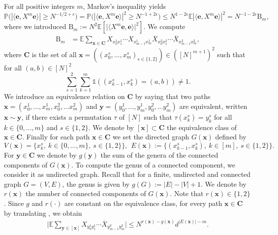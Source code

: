 \documentclass[11pt]{article}
\newcommand{\absbb}[1]{\biggl| #1 \biggr|}
\newcommand{\patx}{\boldsymbol{x}}
\newcommand{\paty}{\boldsymbol{y}}
\theoremstyle{plain}
\theoremstyle{remark}
\numberwithin{equation}{section}
\begin{document}
For all positive integers $m$, Markov's inequality yields 
\begin{equation}\label{eq:bound_pb_Am2}
  \mathbb{P} \bigl( |\langle \mathbf e, X^m \mathbf e \rangle| \ge N^{-1/2+ \epsilon} \bigr) =  \mathbb{P} \bigl( |\langle \mathbf e, X^m \mathbf e \rangle|^2 \ge N^{-1 + 2 \epsilon}\bigr) \le N^{1- 2\epsilon}{\mathbb{E} |\langle \mathbf e, X^m \mathbf e \rangle|^2}
  = N^{-1 -2 \epsilon} \mathrm{B}_m, 
\end{equation}
where we introduced $\mathrm{B}_{m}:= N^2\mathbb{E}[\big|\langle X^m \mathbf e, \mathbf e \rangle \big|^2]$. We compute 
    \begin{align*}
\mathrm{B}_{m} &= \mathbb{E} \sum_{\patx\in \boldsymbol C} X_{x_0^1 x_1^1} \cdots X_{x_{m-1}^{1} x_{m}^{1}} \overline{X}_{x_{0}^{2} x_{1}^{2}} \cdots\overline{X}_{x_{m-1}^2 x_m^2}, 
    \end{align*}
where $\boldsymbol{C}$ is the set of all $\patx = ((x^s_0,...,x^s_m)_{s\in \{1,2\}}) \in ([N]^{m+1})^2$ such that for all $(a,b) \in [N]^2$
    $$\sum_{s=1}^2\sum_{k=1}^m \mathds{1}\left( (x^s_{k-1} , x^s_{k}) = (a,b) \right) \neq 1.$$
   We introduce an equivalence relation on $\boldsymbol C$ by saying that two paths $\patx=(x_0^1,\ldots, x_m^1,x_0^2, \ldots x_m^2)$ and $\boldsymbol y=(y_0^1,\ldots, y_m^1,y_0^2, \ldots y_m^2)$ are equivalent, written $\patx \sim \boldsymbol y$,  if there exists a permutation $\tau$ of $[N]$ such that $\tau(x_k^s) = {y}^s_k$ for all $k \in \{0,...,m\}$ and $s \in \{1,2\}$. We denote by $[\patx] \subset \boldsymbol C$ the equivalence class of $\patx \in \boldsymbol C$. Finally for each path $\patx \in \boldsymbol C$ we set the directed graph $G(\patx)$ defined by
\begin{equation*}
    V(\patx) = \{x_k^s,~k\in \{0,...,m \}, ~ s \in  \{1,2\}\}, ~~ E(\patx):= \{ (x_{k-1}^s, x_k^s),~k \in [m],~ s \in  \{1,2\}\}.
\end{equation*}
 For $\paty \in \boldsymbol C$ we denote by $g(\paty)$ the  sum of the genera of the connected components of $G(\patx)$. To compute the genus of a connected component, we consider it as undirected graph. Recall that for a finite, undirected and connected graph $G=(V,E)$, the genus is given by $g(G):= |E|-|V|+1$. 
We denote by $r(\patx)$ the number of connected components of $G(\patx)$. Note that $ r(\patx) \in \{1 , 2\}$. Since $g$ and $r(\cdot)$ are constant on the equivalence class, for every  path $\patx \in \boldsymbol C$ by translating \cite[proof of Lemma~5.3]{BBK_spec_radii}, we obtain
\begin{align}\label{eq:estimate_x_fixed}
    \absbb{\mathbb{E} \sum_{\paty  \in [ \patx]} X_{y^1_0 y^1_{1}} \cdots  \overline{X}_{y^2_{m-1} y^2_{m}}}\le N^{r(\patx) - g(\patx)} d^{|E(\patx)|-m}.
\end{align}
\end{document}
